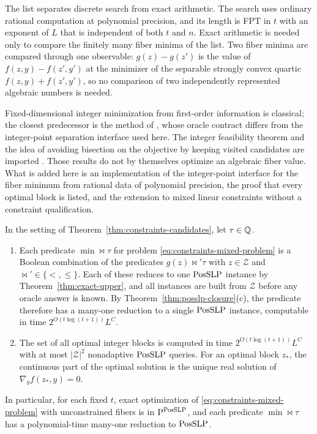 The list separates discrete search from exact arithmetic. The search uses
ordinary rational computation at polynomial precision, and its length is FPT
in $t$ with an exponent of $L$ that is independent of both $t$ and $n$. Exact
arithmetic is needed only to compare the finitely many fiber minima of the
list. Two fiber minima are compared through one observable: $g(z)-g(z')$ is
the value of $f(z,y)-f(z',y')$ at the minimizer of the separable strongly
convex quartic $f(z,y)+f(z',y')$, so no comparison of two independently
represented algebraic numbers is needed.

Fixed-dimensional integer minimization from first-order information is
classical; the closest predecessor is the method of
\citet{OertelWagnerWeismantel2014}, whose oracle contract differs from the
integer-point separation interface used here. The integer feasibility theorem
and the idea of avoiding bisection on the objective by keeping visited
candidates are imported \citep{AriHildebrand2026,HildebrandGoess2024,Basu2023Integers}.
Those results do not by themselves optimize an algebraic fiber value. What is
added here is an implementation of the integer-point interface for the fiber
minimum from rational data of polynomial precision, the proof that every
optimal block is listed, and the extension to mixed linear constraints without
a constraint qualification.

\begin{corollary}
\label{cor:constraints-selection}
In the setting of Theorem~\ref{thm:constraints-candidates}, let $\tau\in\mathbb Q$.
\begin{enumerate}[label=(\alph*)]
\item Each predicate $\min\bowtie\tau$ for problem
\eqref{eq:constraints-mixed-problem} is a Boolean combination of the
predicates $g(z)\bowtie'\tau$ with $z\in\mathcal Z$ and
${\bowtie'}\in\{<,\le\}$. Each of these reduces to one $\mathrm{PosSLP}$ instance by
Theorem~\ref{thm:exact-upper}, and all instances are built from $\mathcal Z$
before any oracle answer is known. By Theorem~\ref{thm:posslp-closure}(c), the
predicate therefore has a many-one reduction to a single $\mathrm{PosSLP}$ instance,
computable in time $2^{O(t\log(t+1))}L^{C}$.
\item The set of all optimal integer blocks is computed in time
$2^{O(t\log(t+1))}L^{C}$ with at most $|\mathcal Z|^2$ nonadaptive $\mathrm{PosSLP}$
queries. For an optimal block $z_*$, the continuous part of the optimal
solution is the unique real solution of $\nabla_yf(z_*,y)=0$.
\end{enumerate}
In particular, for each fixed $t$, exact optimization of
\eqref{eq:constraints-mixed-problem} with unconstrained fibers is in
$\mathrm P^{\mathrm{PosSLP}}$, and each predicate $\min\bowtie\tau$ has a
polynomial-time many-one reduction to $\mathrm{PosSLP}$.
\end{corollary}

